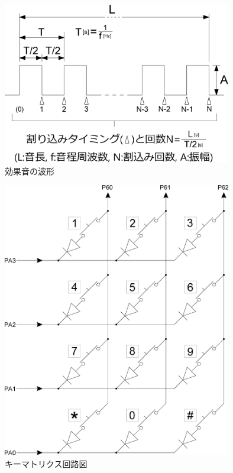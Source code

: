 ﻿\documentclass{jarticle}
\begin{document}
\begin{figure}[!h]
	\begin{center}
		\includegraphics[width=10cm]{./figure4.eps}
	\end{center}
	\caption{効果音の波形}
\end{figure}

\newpage







\newpage

\begin{figure}[h]
	\begin{center}
		\includegraphics[width=10cm]{./figure5.eps}
	\end{center}
	\caption{キーマトリクス回路図}
\end{figure}
\end{document}
